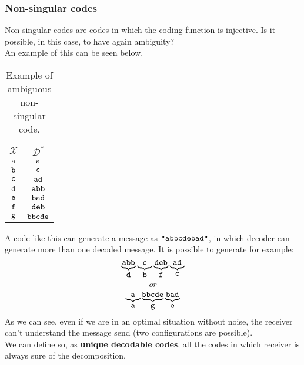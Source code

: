 \subsubsection{Non-singular codes}
Non-singular codes are codes in which the coding function is injective. Is it possible, in this case, to have again ambiguity?\\
An example of this can be seen below.
\begin{table}[H]
	\centering
	\begin{tabular}{| c | c |}
		\hline
		$\mathcal{X}$ & $\mathcal{D}^*$\\\hline
		$\verb|a|$ & $\verb|a|$ \\
		$\verb|b|$ & $\verb|c|$ \\
		$\verb|c|$ & $\verb|ad|$ \\
		$\verb|d|$ & $\verb|abb|$ \\
		$\verb|e|$ & $\verb|bad|$ \\
		$\verb|f|$ & $\verb|deb|$ \\
		$\verb|g|$ & $\verb|bbcde|$ \\
		\hline
	\end{tabular}
	\caption{Example of ambiguous non-singular code.}
\end{table}
\par
A code like this can generate a message as $\verb|"abbcdebad"|$, in which decoder can generate more than one decoded message. It is possible to generate for example:
$$\underbrace{\texttt{abb}}_{\verb|d|}\underbrace{\texttt{c}}_{\verb|b|}\underbrace{\texttt{deb}}_{\verb|f|}\underbrace{\texttt{ad}}_{\verb|c|}$$
$$or$$
$$\underbrace{\texttt{a}}_{\verb|a|}\underbrace{\texttt{bbcde}}_{\verb|g|}\underbrace{\texttt{bad}}_{\verb|e|}$$
As we can see, even if we are in an optimal situation without noise, the receiver can't understand the message send (two configurations are possible).\\
We can define so, as \textbf{unique decodable codes}, all the codes in which receiver is always sure of the decomposition.

